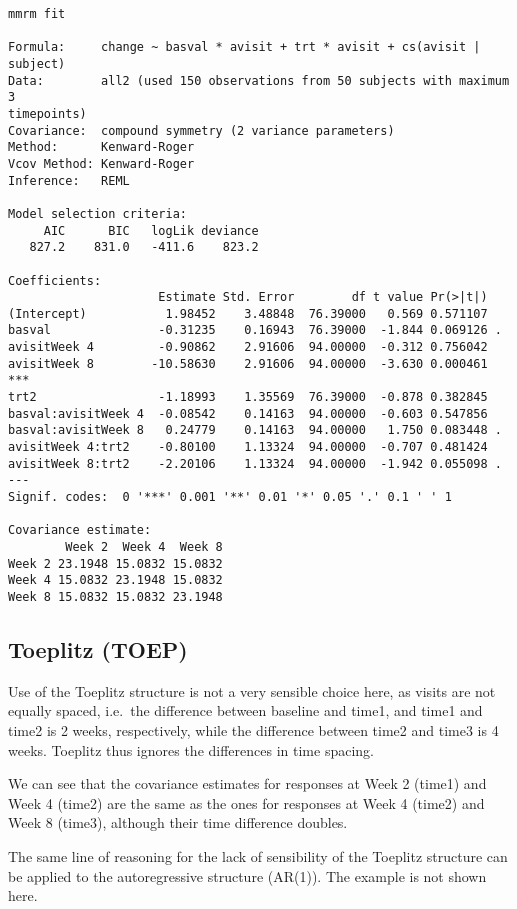 \documentclass[
  letterpaper,
  DIV=11,
  numbers=noendperiod]{scrreprt}
\begin{document}
\begin{verbatim}
mmrm fit

Formula:     change ~ basval * avisit + trt * avisit + cs(avisit | subject)
Data:        all2 (used 150 observations from 50 subjects with maximum 3 
timepoints)
Covariance:  compound symmetry (2 variance parameters)
Method:      Kenward-Roger
Vcov Method: Kenward-Roger
Inference:   REML

Model selection criteria:
     AIC      BIC   logLik deviance 
   827.2    831.0   -411.6    823.2 

Coefficients: 
                     Estimate Std. Error        df t value Pr(>|t|)    
(Intercept)           1.98452    3.48848  76.39000   0.569 0.571107    
basval               -0.31235    0.16943  76.39000  -1.844 0.069126 .  
avisitWeek 4         -0.90862    2.91606  94.00000  -0.312 0.756042    
avisitWeek 8        -10.58630    2.91606  94.00000  -3.630 0.000461 ***
trt2                 -1.18993    1.35569  76.39000  -0.878 0.382845    
basval:avisitWeek 4  -0.08542    0.14163  94.00000  -0.603 0.547856    
basval:avisitWeek 8   0.24779    0.14163  94.00000   1.750 0.083448 .  
avisitWeek 4:trt2    -0.80100    1.13324  94.00000  -0.707 0.481424    
avisitWeek 8:trt2    -2.20106    1.13324  94.00000  -1.942 0.055098 .  
---
Signif. codes:  0 '***' 0.001 '**' 0.01 '*' 0.05 '.' 0.1 ' ' 1

Covariance estimate:
        Week 2  Week 4  Week 8
Week 2 23.1948 15.0832 15.0832
Week 4 15.0832 23.1948 15.0832
Week 8 15.0832 15.0832 23.1948
\end{verbatim}

\hypertarget{toeplitz-toep}{%
\subsection{Toeplitz (TOEP)}\label{toeplitz-toep}}

Use of the Toeplitz structure is not a very sensible choice here, as
visits are not equally spaced, i.e.~the difference between baseline and
time1, and time1 and time2 is 2 weeks, respectively, while the
difference between time2 and time3 is 4 weeks. Toeplitz thus ignores the
differences in time spacing.

We can see that the covariance estimates for responses at Week 2 (time1)
and Week 4 (time2) are the same as the ones for responses at Week 4
(time2) and Week 8 (time3), although their time difference doubles.

The same line of reasoning for the lack of sensibility of the Toeplitz
structure can be applied to the autoregressive structure (AR(1)). The
example is not shown here.
\end{document}
